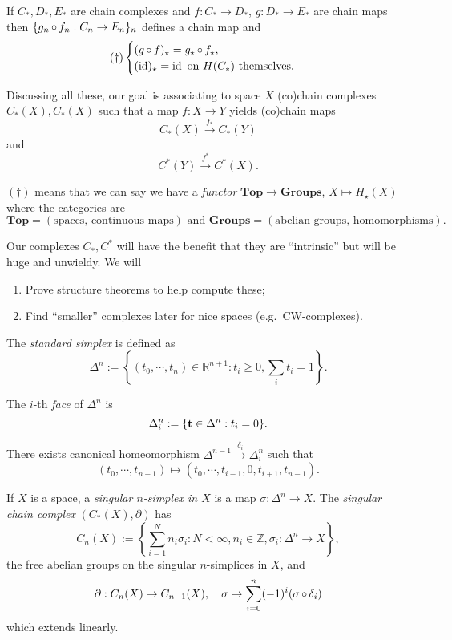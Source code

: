\documentclass[a4paper,11pt]{article}
\begin{document}
	\begin{exer}
		If $C_*, D_*, E_*$ are chain complexes and $f : C_* \to D_*$, $g: D_* \to E_*$ are chain maps then $\{g_n \operatorname{\circ} f_n : C_n \to E_n\}_n$ defines a chain map and
		\[
			(\dagger)\begin{cases}
				(g \operatorname{\circ} f)_\star = g_\star \operatorname{\circ} f_\star,\\
				(\operatorname{id})_\star = \operatorname{id} \text{ on $H(C_*)$ themselves}.
			\end{cases}
		\]
	\end{exer}

	Discussing all these, our goal is associating to space $X$ (co)chain complexes $C_*(X), C_*(X)$ such that a map $f : X \to Y$ yields (co)chain maps
	\[
		C_* (X) \xrightarrow{f_*} C_* (Y)
	\]
	and
	\[
		C^* (Y) \xrightarrow{f^*} C^*(X).
	\]
	
	\begin{nt}
		$(\dagger)$ means that we can say we have a \emph{functor} $\mathbf{Top} \to \mathbf{Groups}$, $X \mapsto H_\star(X)$ where the categories are 
		\[
			\mathbf{Top} = (\text{spaces, continuous maps})\text{ and }\mathbf{Groups} = (\text{abelian groups, homomorphisms}). 
		\]
		
	\end{nt}

	Our complexes $C_*, C^*$ will have the benefit that they are ``intrinsic'' but will be huge and unwieldy. We will 
	\begin{enumerate}
		\item Prove structure theorems to help compute these;
		\item Find ``smaller'' complexes later for nice spaces (e.g.\ CW-complexes).
	\end{enumerate}

	\begin{defi}
		The \emph{standard simplex} is defined as 
		\[
			\Delta^n := \left\{(t_0, \cdots, t_n)\in \mathbb{R}^{n+1} : t_i \geq 0, \sum_i t_i = 1\right\}.
		\]
		
		The $i$-th \emph{face} of $\Delta^n$ is
		\[
			\Delta^n_i := \{\vb t \in \Delta^n : t_i = 0\}.
		\]
	\end{defi}

	\begin{nt}
		There exists canonical homeomorphism $\Delta^{n-1} \xrightarrow{\delta_i} \Delta^n_i$ such that
		\[
			(t_0, \cdots, t_{n-1}) \mapsto (t_0, \cdots, t_{i-1}, 0, t_{i+1}, t_{n-1}).
		\]
	\end{nt}

	\begin{defi}
		If $X$ is a space, a \emph{singular $n$-simplex in $X$} is a map $\sigma: \Delta^n \to X$. The \emph{singular chain complex} $(C_*(X),\partial)$ has
		\[
			C_n (X) := \left\{ \sum_{i=1}^N n_i \sigma_i : N<\infty, n_i \in \mathbb{Z}, \sigma_i: \Delta^n \to X\right\},
		\]
		the free abelian groups on the singular $n$-simplices in $X$, and
		\[
			\partial: C_n (X) \to C_{n-1}(X), \quad \sigma \mapsto \sum_{i=0}^n (-1)^i (\sigma \operatorname{\circ} \delta_i)
		\]
		which extends linearly.
	\end{defi}
\end{document}
